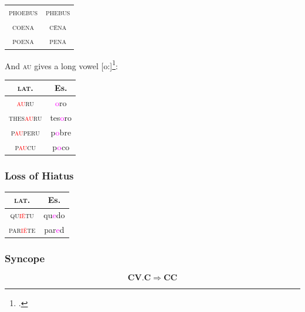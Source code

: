 \documentclass{report}[12pt]
\begin{document}
\begin{center}
  \begin{tabular}{c c}
    \textsc{phoebus} & \textsc{phebus} \\
    \textsc{coena} & \textsc{c\={e}na} \\
    \textsc{poena} & \textsc{pena} \\ 
  \end{tabular}
\end{center}
And \textsc{au} gives a long vowel [o:]\footcite[p.~24]{romance_his}:
\begin{center}
\begin{tabular}{c c}
  \textsc{lat.} & Es. \\
  \hline
  \textsc{\textcolor{red}{au}ru} & \textcolor{magenta}{o}ro \\
  \textsc{thes\textcolor{red}{au}ru} & tes\textcolor{magenta}{o}ro \\
  \textsc{p\textcolor{red}{au}peru} & p\textcolor{magenta}{o}bre \\
  \textsc{p\textcolor{red}{au}cu} & p\textcolor{magenta}{o}co \\
\end{tabular}
\end{center}

\subsubsection{Loss of Hiatus}

\begin{tcolorbox}

\end{tcolorbox}

\begin{tabular}{c c}
  \textsc{lat.} & Es. \\
  \hline
  \textsc{qu\textcolor{red}{i\={e}}tu} & qu\textcolor{magenta}{e}do \\
  \textsc{par\textcolor{red}{i\u{e}}te} & par\textcolor{magenta}{e}d \\
\end{tabular}

\subsubsection{Syncope}

\begin{tcolorbox}
   \[ \textbf{C}\textbf{V}.\textbf{C} \Rightarrow \textbf{C}\textbf{C} \]
\end{tcolorbox}
\end{document}
